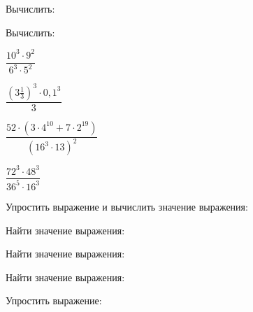 \begin{listofex}
	\item Вычислить: %
	\begin{enumcols}[itemcolumns=2]
		\item {}
		\item {}
	\end{enumcols}
	\item Вычислить: %
	\begin{enumcols}[itemcolumns=4]
		\item \( \dfrac{10^3\cdot9^2}{6^3\cdot5^2} \)
		\item \( \dfrac{\left( 3\frac{1}{3} \right)^3\cdot0,1^3}{3} \)
		\item \( \dfrac{52\cdot(3\cdot4^{10}+7\cdot2^{19})}{(16^3\cdot13)^2} \)
		\item \( \dfrac{72^3\cdot48^3}{36^5\cdot16^3} \)
	\end{enumcols}
	\item Упростить выражение и вычислить значение выражения: %
	\begin{enumcols}[itemcolumns=1]
		\item {}
		\item {}
	\end{enumcols}
	\item Найти значение выражения: %
	\begin{enumcols}[itemcolumns=2]
		\item {}
		\item {}
		\item {}
		\item {}
	\end{enumcols}
	\item Найти значение выражения: %
	\begin{enumcols}[itemcolumns=2]
		\item {}
		\item {}
	\end{enumcols}
	\item Найти значение выражения: %
	\begin{enumcols}[itemcolumns=2]
		\item {}
		\item {}
	\end{enumcols}
	\item Упростить выражение: %
	\begin{enumcols}[itemcolumns=2]
		\item {}
		\item {}
		\item {}
		\item {}
		\item {}
		\item {}
	\end{enumcols}
\end{listofex}